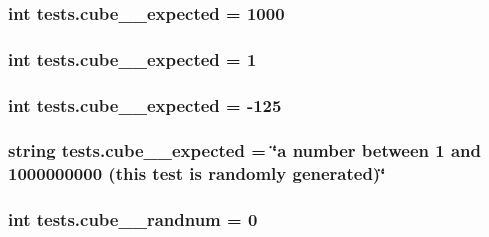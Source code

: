 \subsubsection[{cube\+\_\+1\+\_\+expected}]{\setlength{\rightskip}{0pt plus 5cm}int tests.\+cube\+\_\+\_\+expected = 1000}\label{namespacetests_aa1d0d3104146bdad07555bf7544787f5}
\hypertarget{namespacetests_a73b0c5584c555814213c44e21368d58d}{}
\subsubsection[{cube\+\_\+2\+\_\+expected}]{\setlength{\rightskip}{0pt plus 5cm}int tests.\+cube\+\_\+\_\+expected = 1}\label{namespacetests_a73b0c5584c555814213c44e21368d58d}
\hypertarget{namespacetests_af7ab12c493c42f39d1d3be2e4f2997c8}{}
\subsubsection[{cube\+\_\+3\+\_\+expected}]{\setlength{\rightskip}{0pt plus 5cm}int tests.\+cube\+\_\+\_\+expected = -\/125}\label{namespacetests_af7ab12c493c42f39d1d3be2e4f2997c8}
\hypertarget{namespacetests_ae3685c78796cb7b24747ab8cb9ee8f7c}{}
\subsubsection[{cube\+\_\+4\+\_\+expected}]{\setlength{\rightskip}{0pt plus 5cm}string tests.\+cube\+\_\+\_\+expected = \char`\"{}a number between 1 and 1000000000 (this test is randomly generated)\char`\"{}}\label{namespacetests_ae3685c78796cb7b24747ab8cb9ee8f7c}
\hypertarget{namespacetests_a025a27d3126aff00f2e8351cc47b98af}{}
\subsubsection[{cube\+\_\+4\+\_\+randnum}]{\setlength{\rightskip}{0pt plus 5cm}int tests.\+cube\+\_\+\_\+randnum = 0}\label{namespacetests_a025a27d3126aff00f2e8351cc47b98af}
\hypertarget{namespacetests_ace0d3b9c40d408671c0564c236a60f96}{}
